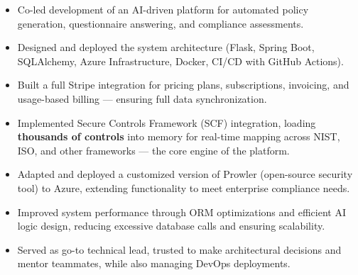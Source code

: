 \documentclass[10pt,a4paper,ragged2e,withhyper]{altacv}
\begin{document}
\begin{paracol}{2}
            \begin{itemize}
                \item Co-led development of an AI-driven platform for automated policy generation, questionnaire answering, and compliance assessments.
                \item Designed and deployed the system architecture (Flask, Spring Boot, SQLAlchemy, Azure Infrastructure, Docker, CI/CD with GitHub Actions).
                \item Built a full Stripe integration  for pricing plans, subscriptions, invoicing, and usage-based billing — ensuring full data synchronization.
                \item Implemented Secure Controls Framework (SCF) integration, loading \textbf{thousands of controls} into memory for real-time mapping across NIST, ISO, and other frameworks — the core engine of the platform.
                \item Adapted and deployed a customized version of Prowler (open-source security tool) to Azure, extending functionality to meet enterprise compliance needs.
                \item Improved system performance through ORM optimizations and efficient AI logic design, reducing excessive database calls and ensuring scalability.
                \item Served as go-to technical lead, trusted to make architectural decisions and mentor teammates, while also managing DevOps deployments.
            \end{itemize}

            \divider


\end{paracol}
\end{document}
